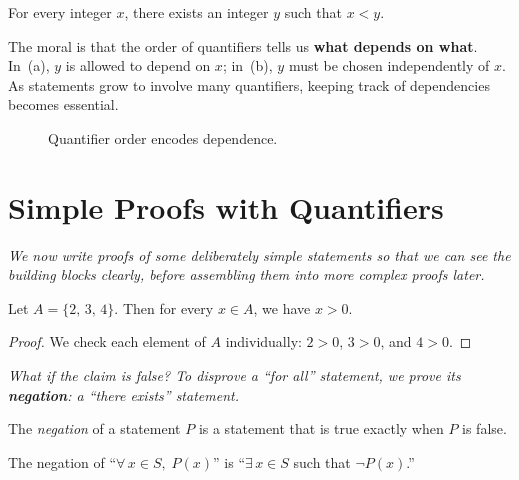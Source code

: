 \begin{theorem}
\label{thm:1-1}
For every integer $x$, there exists an integer $y$ such that $x < y$.
\end{theorem}

\begin{remark}
The moral is that the order of quantifiers tells us \textbf{what depends on what}.  In~(a), $y$ is allowed to depend on $x$; in~(b), $y$ must be chosen independently of $x$.  As statements grow to involve many quantifiers, keeping track of dependencies becomes essential.
\end{remark}

\begin{figure}[ht]
  \centering
  
  \caption{Quantifier order encodes dependence.}
  \label{fig:quantifier-dependence}
\end{figure}

\section{Simple Proofs with Quantifiers}
\label{sec:1.5}

\textit{We now write proofs of some deliberately simple statements so that we can see the building blocks clearly, before assembling them into more complex proofs later.}

\begin{theorem}
\label{thm:1-2}
Let $A = \{2,\,3,\,4\}$.  Then for every $x \in A$, we have $x > 0$.
\end{theorem}

\begin{proof}
We check each element of $A$ individually: $2 > 0$, $3 > 0$, and $4 > 0$.
\end{proof}

\textit{What if the claim is false?  To disprove a ``for all'' statement, we prove its \textbf{negation}: a ``there exists'' statement.}

\begin{definition}[Negation]
\label{def:1-8}
The \emph{negation} of a statement $P$ is a statement that is true exactly when $P$ is false.
\end{definition}

The negation of ``$\forall\, x \in S,\; P(x)$'' is ``$\exists\, x \in S$ such that $\lnot P(x)$\@.''

